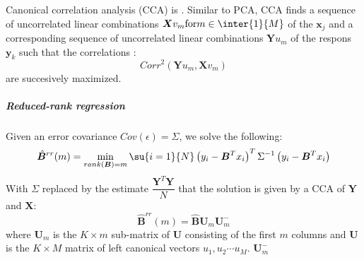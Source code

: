 Canonical correlation analysis (CCA) is . Similar to PCA, CCA finds a sequence of uncorrelated linear
combinations $\bm{X}v_{m} \text{for} m\in\inter{1}{M}$ of the $\bm{x}_{j}$ and a 
corresponding sequence of uncorrelated linear combinations $\bm{Y}u_{m}$ of the respons
$\bm{y}_{k}$ such that the correlations :
$$ Corr^{2}\left( \bm{Y}u_{m}, \bm{X}v_{m} \right)$$ are succesively maximized.
\subparagraph{Reduced-rank regression}
Given an error covariance $Cov(\epsilon)=\Sigma$, we solve the following:
$$ \hat{\bm{B}}^{rr}(m) =\min\limits_{{rank(\bm{B})=m}}\su{{i=1}}{N}\left( y_{i}-
\bm{B}^{T}x_{i}\right)^{T}\Sigma^{-1}\left( y_{i} - \bm{B}^{T}x_{i}\right) $$
With $\Sigma$ replaced by the estimate $\dfrac{\bm{Y}^{T}\bm{Y}}{N}$ that the solution
is given by a CCA of $\bm{Y}$ and $\bm{X}$:
$$ \hat{\bm{B}}^{rr}(m) = \hat{\bm{B}}\bm{U}_{m}\bm{U}_{m}^{-}$$ where $\bm{U}_{m}$ is
the $K\times m$ sub-matrix of $\bm{U}$ consisting of the first $m$ columns and $\bm{U}$
is the $K\times M$ matrix of left canonical vectors $u_{1}, u_{2}\cdots u_{M}$.
$\bm{U}^{-}_{m}$
